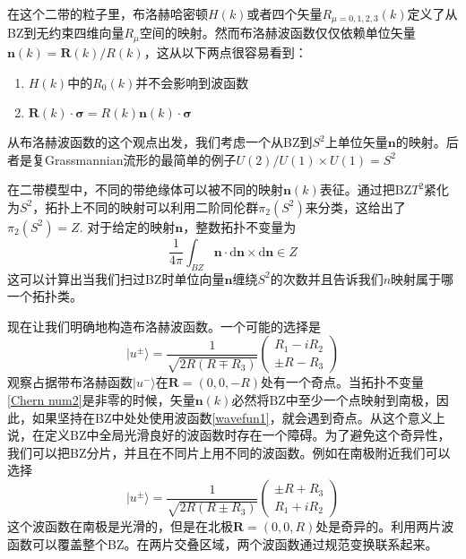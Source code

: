 \documentclass[a4paper]{article}
\numberwithin{equation}{subsection}
\begin{document}
在这个二带的粒子里，布洛赫哈密顿$H(k)$或者四个矢量$R_{\mu=0,1,2,3}(k)$定义了从BZ到无约束四维向量$R_\mu$空间的映射。然而布洛赫波函数仅仅依赖单位矢量$\mathbf{n}(k)=\mathbf{R}(k)/R(k)$，这从以下两点很容易看到：
\begin{enumerate}
    \item $H(k)$中的$R_0(k)$并不会影响到波函数
    \item $\mathbf{R}(k)\cdot\mathbf{\sigma}=R(k)\mathbf{n}(k)\cdot\mathbf{\sigma}$
\end{enumerate}
从布洛赫波函数的这个观点出发，我们考虑一个从BZ到$S^2$上单位矢量$\mathbf{n}$的映射。后者是复Grassmannian流形的最简单的例子$U(2)/U(1)\times U(1)=S^2$

在二带模型中，不同的带绝缘体可以被不同的映射$\mathbf{n}(k)$表征。通过把BZ$T^2$紧化为$S^2$，拓扑上不同的映射可以利用二阶同伦群$\pi_2(S^2)$来分类，这给出了$\pi_2(S^2)=Z$. 对于给定的映射$\mathbf{n}$，整数拓扑不变量为
\begin{equation}\label{Chern num2}
    \frac{1}{4\pi}\int_{BZ}\mathbf{n}\cdot\mathrm{d}\mathbf{n}\times\mathrm{d}\mathbf{n}\in Z
\end{equation}
这可以计算出当我们扫过BZ时单位向量$\mathbf{n}$缠绕$S^2$的次数并且告诉我们$n$映射属于哪一个拓扑类。

现在让我们明确地构造布洛赫波函数。一个可能的选择是
\begin{equation}\label{wavefun1}
    |u^{\pm}\rangle=\frac{1}{\sqrt{2R(R\mp R_3)}}\begin{pmatrix}
        R_1-iR_2\\
        \pm R-R_3
    \end{pmatrix}
\end{equation}
观察占据带布洛赫函数$|u^-\rangle$在$\mathbf{R}=(0,0,-R)$处有一个奇点。当拓扑不变量\eqref{Chern num2}是非零的时候，矢量$\mathbf{n}(k)$必然将BZ中至少一个点映射到南极，因此，如果坚持在BZ中处处使用波函数\eqref{wavefun1}，就会遇到奇点。从这个意义上说，在定义BZ中全局光滑良好的波函数时存在一个障碍。为了避免这个奇异性，我们可以把BZ分片，并且在不同片上用不同的波函数。例如在南极附近我们可以选择
\begin{equation}\label{wavefun2}
    |u^\pm\rangle=\frac{1}{\sqrt{2R(R\pm R_3)}}\begin{pmatrix}
        \pm R+R_3\\
        R_1+i R_2
    \end{pmatrix}
\end{equation}
这个波函数在南极是光滑的，但是在北极$\mathbf{R}=(0,0,R)$处是奇异的。利用两片波函数可以覆盖整个BZ。在两片交叠区域，两个波函数通过规范变换联系起来。
\end{document}
